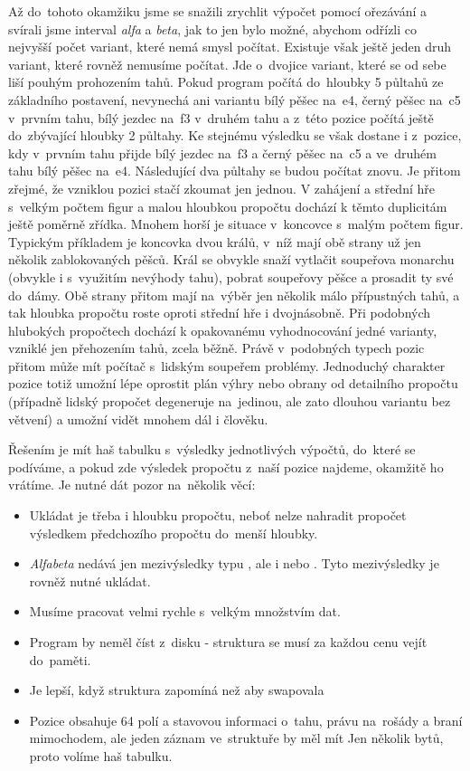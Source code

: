 \documentclass[11pt, titlepage]{article}
\begin{document}
Až do~tohoto okamžiku jsme se snažili zrychlit výpočet pomocí ořezávání a svírali jsme interval {\it alfa} a {\it beta}, jak to jen bylo možné, abychom odřízli co nejvyšší počet variant, které nemá smysl počítat. Existuje však ještě jeden druh variant, které rovněž nemusíme počítat. Jde o~dvojice variant, které se od sebe liší pouhým prohozením tahů. Pokud program počítá do~hloubky 5 půltahů ze základního postavení, nevynechá ani variantu bílý pěšec na~e4, černý pěšec na~c5 v~prvním tahu, bílý jezdec na~f3 v~druhém tahu a z~této pozice počítá ještě do~zbývající hloubky 2 půltahy. Ke stejnému výsledku se však dostane i z~pozice, kdy v~prvním tahu přijde bílý jezdec na~f3 a černý pěšec na~c5 a ve~druhém tahu bílý pěšec na~e4. Následující dva půltahy se budou počítat znovu. Je přitom zřejmé, že vzniklou pozici stačí zkoumat jen jednou.
V zahájení a střední hře s~velkým počtem figur a malou hloubkou propočtu dochází k těmto duplicitám ještě poměrně zřídka. Mnohem horší je situace v~koncovce s~malým počtem figur. Typickým příkladem je koncovka dvou králů, v~níž mají obě strany už jen několik zablokovaných pěšců. Král se obvykle snaží vytlačit soupeřova monarchu (obvykle i s~využitím nevýhody tahu), pobrat soupeřovy pěšce a prosadit ty své do~dámy. Obě strany přitom mají na~výběr jen několik málo přípustných tahů, a tak hloubka propočtu roste oproti střední hře i dvojnásobně. Při podobných hlubokých propočtech dochází k opakovanému vyhodnocování jedné varianty, vzniklé jen přehozením tahů, zcela běžně. Právě v~podobných typech pozic přitom může mít počítač s~lidským soupeřem problémy. Jednoduchý charakter pozice totiž umožní lépe oprostit plán výhry nebo obrany od detailního propočtu (případně lidský propočet degeneruje na~jedinou, ale zato dlouhou variantu bez větvení) a umožní vidět mnohem dál i člověku.

Řešením je mít haš tabulku s~výsledky jednotlivých výpočtů, do~které se podíváme, a pokud zde výsledek propočtu z~naší pozice najdeme, okamžitě ho vrátíme. Je nutné dát pozor na~několik věcí:
\begin{itemize}
	\item Ukládat je třeba i hloubku propočtu, neboť nelze nahradit propočet výsledkem předchozího propočtu do~menší hloubky.
	\item {\it Alfabeta} nedává jen mezivýsledky typu , ale i  nebo . Tyto mezivýsledky je rovněž nutné ukládat.
	\item Musíme pracovat velmi rychle s~velkým množstvím dat.
	\item Program by neměl číst z~disku - struktura se musí za každou cenu vejít do~paměti.
	\item Je lepší, když struktura zapomíná než aby swapovala
	\item Pozice obsahuje 64 polí a stavovou informaci o~tahu, právu na~rošády a braní mimochodem, ale jeden záznam ve~struktuře by měl mít Jen několik bytů, proto volíme haš tabulku.
\end{itemize}
\end{document}
